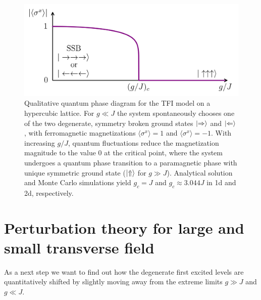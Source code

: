 \begin{figure}[h]
  \centering
  \includegraphics[width=0.7\linewidth]{tfi_phase_diagram.png}
  \caption{Qualitative quantum phase diagram for the TFI model on a hypercubic lattice. For $g \ll J$ the system spontaneously chooses one of the two degenerate, symmetry broken ground states $\ket{\Rightarrow}$ and $\ket{\Leftarrow}$, with ferromagnetic magnetizations $\langle \sigma^x \rangle= 1$ and $\langle \sigma^x \rangle = -1$. With increasing $g/J$, quantum fluctuations reduce the magnetization magnitude to the value $0$ at the critical point, where the system undergoes a quantum phase transition to a paramagnetic phase with unique symmetric ground state ($\ket{\Uparrow}$ for $g \gg J$). Analytical solution and Monte Carlo simulations yield $g_c = J$ and $g_c \approx 3.044J$ in 1d and 2d, respectively.}
\label{fig:tfi_phase_diagram}
\end{figure}


\section{Perturbation theory for large and small transverse field} \label{sec:tfi_perturbation_theory}

As a next step we want to find out how the degenerate first excited levels are quantitatively shifted by slightly moving away from the extreme limits $g \gg J$ and $g \ll J$. \\

